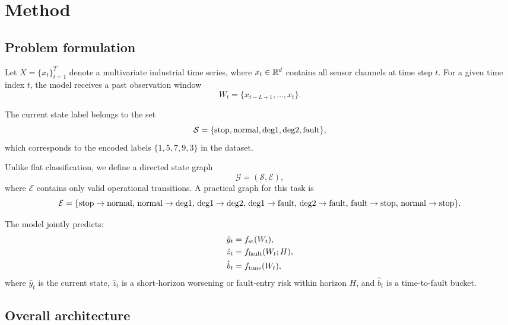 \section{Method}
\label{sec:method}

\subsection{Problem formulation}

Let $X=\{x_t\}_{t=1}^{T}$ denote a multivariate industrial time series, where $x_t \in \mathbb{R}^d$ contains all sensor channels at time step $t$. For a given time index $t$, the model receives a past observation window
\begin{equation}
W_t = \{x_{t-L+1}, \ldots, x_t\}.
\end{equation}

The current state label belongs to the set
\begin{equation}
\mathcal{S} = \{\mathrm{stop}, \mathrm{normal}, \mathrm{deg1}, \mathrm{deg2}, \mathrm{fault}\},
\end{equation}
which corresponds to the encoded labels $\{1, 5, 7, 9, 3\}$ in the dataset.

Unlike flat classification, we define a directed state graph
\begin{equation}
\mathcal{G}=(\mathcal{S}, \mathcal{E}),
\end{equation}
where $\mathcal{E}$ contains only valid operational transitions. A practical graph for this task is
\begin{equation}
\mathcal{E} = \{
\mathrm{stop} \rightarrow \mathrm{normal},\,
\mathrm{normal} \rightarrow \mathrm{deg1},\,
\mathrm{deg1} \rightarrow \mathrm{deg2},\,
\mathrm{deg1} \rightarrow \mathrm{fault},\,
\mathrm{deg2} \rightarrow \mathrm{fault},\,
\mathrm{fault} \rightarrow \mathrm{stop},\,
\mathrm{normal} \rightarrow \mathrm{stop}
\}.
\end{equation}

The model jointly predicts:
\begin{align}
\hat{y}_t &= f_{\mathrm{st}}(W_t), \\
\hat{z}_t &= f_{\mathrm{fault}}(W_t; H), \\
\hat{b}_t &= f_{\mathrm{time}}(W_t),
\end{align}
where $\hat{y}_t$ is the current state, $\hat{z}_t$ is a short-horizon worsening or fault-entry risk within horizon $H$, and $\hat{b}_t$ is a time-to-fault bucket.

\subsection{Overall architecture}

